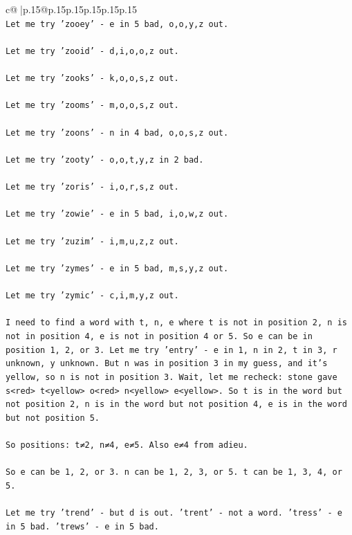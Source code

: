 \documentclass{article}
\begin{document}
{\begin{supertabular}{c@{$\;$}|p{.15\linewidth}@{}p{.15\linewidth}p{.15\linewidth}p{.15\linewidth}p{.15\linewidth}p{.15\linewidth}}
{{{\\ 
\texttt{Let me try 'zooey' {-} e in 5 bad, o,o,y,z out. } \\
\\ 
\texttt{Let me try 'zooid' {-} d,i,o,o,z out. } \\
\\ 
\texttt{Let me try 'zooks' {-} k,o,o,s,z out. } \\
\\ 
\texttt{Let me try 'zooms' {-} m,o,o,s,z out. } \\
\\ 
\texttt{Let me try 'zoons' {-} n in 4 bad, o,o,s,z out. } \\
\\ 
\texttt{Let me try 'zooty' {-} o,o,t,y,z in 2 bad. } \\
\\ 
\texttt{Let me try 'zoris' {-} i,o,r,s,z out. } \\
\\ 
\texttt{Let me try 'zowie' {-} e in 5 bad, i,o,w,z out. } \\
\\ 
\texttt{Let me try 'zuzim' {-} i,m,u,z,z out. } \\
\\ 
\texttt{Let me try 'zymes' {-} e in 5 bad, m,s,y,z out. } \\
\\ 
\texttt{Let me try 'zymic' {-} c,i,m,y,z out.} \\
\\ 
\texttt{I need to find a word with t, n, e where t is not in position 2, n is not in position 4, e is not in position 4 or 5. So e can be in position 1, 2, or 3. Let me try 'entry' {-} e in 1, n in 2, t in 3, r unknown, y unknown. But n was in position 3 in my guess, and it's yellow, so n is not in position 3. Wait, let me recheck: stone gave s<red> t<yellow> o<red> n<yellow> e<yellow>. So t is in the word but not position 2, n is in the word but not position 4, e is in the word but not position 5.} \\
\\ 
\texttt{So positions: t≠2, n≠4, e≠5. Also e≠4 from adieu.} \\
\\ 
\texttt{So e can be 1, 2, or 3. n can be 1, 2, 3, or 5. t can be 1, 3, 4, or 5.} \\
\\ 
\texttt{Let me try 'trend' {-} but d is out. 'trent' {-} not a word. 'tress' {-} e in 5 bad. 'trews' {-} e in 5 bad.} \\
}}}
\end{supertabular}}
\end{document}

